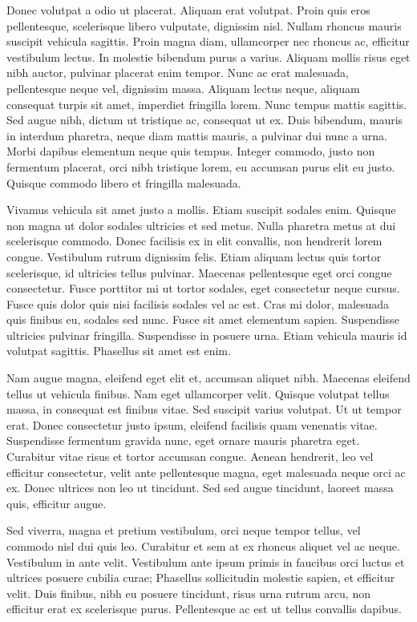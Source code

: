 Donec volutpat a odio ut placerat. Aliquam erat volutpat. Proin quis eros
pellentesque, scelerisque libero vulputate, dignissim nisl. Nullam rhoncus
mauris suscipit vehicula sagittis. Proin magna diam, ullamcorper nec rhoncus
ac, efficitur vestibulum lectus. In molestie bibendum purus a varius. Aliquam
mollis risus eget nibh auctor, pulvinar placerat enim tempor. Nunc ac erat
malesuada, pellentesque neque vel, dignissim massa. Aliquam lectus neque,
aliquam consequat turpis sit amet, imperdiet fringilla lorem. Nunc tempus
mattis sagittis. Sed augue nibh, dictum ut tristique ac, consequat ut ex. Duis
bibendum, mauris in interdum pharetra, neque diam mattis mauris, a pulvinar dui
nunc a urna. Morbi dapibus elementum neque quis tempus. Integer commodo, justo
non fermentum placerat, orci nibh tristique lorem, eu accumsan purus elit eu
justo. Quisque commodo libero et fringilla malesuada.

Vivamus vehicula sit amet justo a mollis. Etiam suscipit sodales enim. Quisque
non magna ut dolor sodales ultricies et sed metus. Nulla pharetra metus at dui
scelerisque commodo. Donec facilisis ex in elit convallis, non hendrerit lorem
congue. Vestibulum rutrum dignissim felis. Etiam aliquam lectus quis tortor
scelerisque, id ultricies tellus pulvinar. Maecenas pellentesque eget orci
congue consectetur. Fusce porttitor mi ut tortor sodales, eget consectetur
neque cursus. Fusce quis dolor quis nisi facilisis sodales vel ac est. Cras mi
dolor, malesuada quis finibus eu, sodales sed nunc. Fusce sit amet elementum
sapien. Suspendisse ultricies pulvinar fringilla. Suspendisse in posuere urna.
Etiam vehicula mauris id volutpat sagittis. Phasellus sit amet est enim.

Nam augue magna, eleifend eget elit et, accumsan aliquet nibh. Maecenas
eleifend tellus ut vehicula finibus. Nam eget ullamcorper velit. Quisque
volutpat tellus massa, in consequat est finibus vitae. Sed suscipit varius
volutpat. Ut ut tempor erat. Donec consectetur justo ipsum, eleifend facilisis
quam venenatis vitae. Suspendisse fermentum gravida nunc, eget ornare mauris
pharetra eget. Curabitur vitae risus et tortor accumsan congue. Aenean
hendrerit, leo vel efficitur consectetur, velit ante pellentesque magna, eget
malesuada neque orci ac ex. Donec ultrices non leo ut tincidunt. Sed sed augue
tincidunt, laoreet massa quis, efficitur augue.

Sed viverra, magna et pretium vestibulum, orci neque tempor tellus, vel commodo
nisl dui quis leo. Curabitur et sem at ex rhoncus aliquet vel ac neque.
Vestibulum in ante velit. Vestibulum ante ipsum primis in faucibus orci luctus
et ultrices posuere cubilia curae; Phasellus sollicitudin molestie sapien, et
efficitur velit. Duis finibus, nibh eu posuere tincidunt, risus urna rutrum
arcu, non efficitur erat ex scelerisque purus. Pellentesque ac est ut tellus
convallis dapibus.

